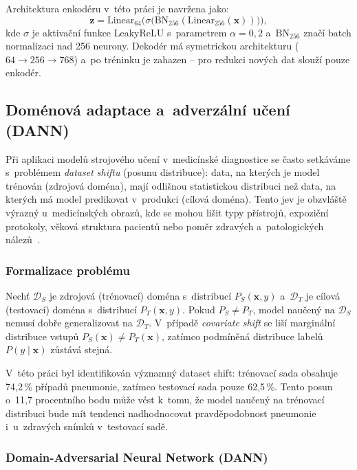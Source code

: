 \documentclass[12pt, a4paper]{report}
\begin{document}
Architektura enkodéru v~této práci je navržena jako:
\begin{equation}
    \mathbf{z} = \text{Linear}_{64} \Big( \sigma \big( \text{BN}_{256}(\text{Linear}_{256}(\mathbf{x})) \big) \Big),
\end{equation}
kde $\sigma$ je aktivační funkce LeakyReLU s~parametrem $\alpha = 0{,}2$ a~$\text{BN}_{256}$ značí batch normalizaci nad 256 neurony. Dekodér má symetrickou architekturu ($64 \to 256 \to 768$) a~po tréninku je zahazen -- pro redukci nových dat slouží pouze enkodér.

\subsection{Doménová adaptace a~adverzální učení (DANN)} \label{subsec:dann_theory}

Při aplikaci modelů strojového učení v~medicínské diagnostice se často setkáváme s~problémem \textit{dataset shiftu} (posunu distribuce): data, na kterých je model trénován (zdrojová doména), mají odlišnou statistickou distribuci než data, na kterých má model predikovat v~produkci (cílová doména). Tento jev je obzvláště výrazný u~medicínských obrazů, kde se mohou lišit typy přístrojů, expoziční protokoly, věková struktura pacientů nebo poměr zdravých a~patologických nálezů~\cite{domain_shift_chestxray}.

\subsubsection{Formalizace problému}

Nechť $\mathcal{D}_S$ je zdrojová (trénovací) doména s~distribucí $P_S(\mathbf{x}, y)$ a~$\mathcal{D}_T$ je cílová (testovací) doména s~distribucí $P_T(\mathbf{x}, y)$. Pokud $P_S \neq P_T$, model naučený na $\mathcal{D}_S$ nemusí dobře generalizovat na $\mathcal{D}_T$. V~případě \textit{covariate shift} se liší marginální distribuce vstupů $P_S(\mathbf{x}) \neq P_T(\mathbf{x})$, zatímco podmíněná distribuce labelů $P(y \mid \mathbf{x})$ zůstává stejná.

V~této práci byl identifikován významný dataset shift: trénovací sada obsahuje 74{,}2\,\% případů pneumonie, zatímco testovací sada pouze 62{,}5\,\%. Tento posun o~11{,}7 procentního bodu může vést k~tomu, že model naučený na trénovací distribuci bude mít tendenci nadhodnocovat pravděpodobnost pneumonie i~u~zdravých snímků v~testovací sadě.

\subsubsection{Domain-Adversarial Neural Network (DANN)}
\end{document}
